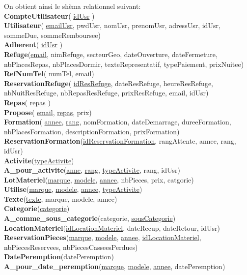 On obtient ainsi le shèma relationnel suivant:\\
\textbf{CompteUtilisateur}( \underline{idUsr} )\\
\textbf{Utilisateur}( \underline{emailUsr}, pwdUsr, nomUsr, prenomUsr, adressUsr, idUsr, sommeDue, sommeRemboursee)\\
\textbf{Adherent}( \underline{idUsr} )\\
\textbf{Refuge}(\underline{email}, nimRefuge, secteurGeo, dateOuverture, dateFermeture, nbPlacesRepas, nbPlacesDormir, texteRepresentatif, typePaiement, prixNuitee)\\
\textbf{RefNumTel}( \underline{numTel}, email)\\
\textbf{ReservationRefuge}( \underline{idResRefuge}, dateResRefuge, heureResRefuge, nbNuitResRefuge, nbRepasResRefuge, prixResRefuge, email, idUsr)\\
\textbf{Repas}( \underline{repas} )\\
\textbf{Propose}( \underline{email}, \underline{repas}, prix)\\
\textbf{Formation}( \underline{annee}, \underline{rang}, nomFormation, dateDemarrage, dureeFormation, nbPlacesFormation, descriptionFormation, prixFormation)\\
\textbf{ReservationFormation}(\underline{idReservationFormation}, rangAttente, annee, rang, idUsr)\\
\textbf{Activite}(\underline{typeActivite})\\
\textbf{A\_pour\_activite}(\underline{anne}, \underline{rang}, \underline{typeActivite}, rang, idUsr)\\
\textbf{LotMateriel}(\underline{marque}, \underline{modele}, \underline{annee}, nbPieces, prix, catgorie)\\
\textbf{Utilise}(\underline{marque}, \underline{modele}, \underline{annee}, \underline{typeActivite})\\
\textbf{Texte}(\underline{texte}, marque, modele, annee)\\
\textbf{Categorie}(\underline{categorie})\\
\textbf{A\_comme\_sous\_categorie}(categorie, \underline{sousCategorie})\\
\textbf{LocationMateriel}(\underline{idLocationMateriel}, dateRecup, dateRetour, idUsr)\\
\textbf{ReservationPieces}(\underline{marque}, \underline{modele}, \underline{annee}, \underline{idLocationMateriel}, nbPiecesReservees, nbPiecesCasseesPerdues)\\
\textbf{DatePeremption}(\underline{datePeremption})\\
\textbf{A\_pour\_date\_peremption}(\underline{marque}, \underline{modele}, \underline{annee}, datePeremption)\\


